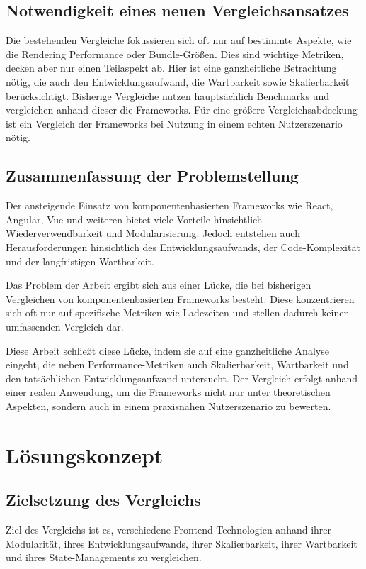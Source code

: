 \documentclass[oneside]{ausarbeitung}
\begin{document}
\section{Notwendigkeit eines neuen Vergleichsansatzes}

Die bestehenden Vergleiche fokussieren sich oft nur auf bestimmte Aspekte, wie die Rendering Performance oder Bundle-Größen. Dies sind wichtige Metriken, decken aber nur einen Teilaspekt ab. Hier ist eine ganzheitliche Betrachtung nötig, die auch den Entwicklungsaufwand, die Wartbarkeit sowie Skalierbarkeit berücksichtigt. Bisherige Vergleiche nutzen hauptsächlich Benchmarks und vergleichen anhand dieser die Frameworks. Für eine größere Vergleichsabdeckung ist ein Vergleich der Frameworks bei Nutzung in einem echten Nutzerszenario nötig. 

\section{Zusammenfassung der Problemstellung}
Der ansteigende Einsatz von komponentenbasierten Frameworks wie React, Angular, Vue und weiteren bietet viele Vorteile hinsichtlich Wiederverwendbarkeit und Modularisierung. Jedoch entstehen auch Herausforderungen hinsichtlich des Entwicklungsaufwands, der Code-Komplexität und der langfristigen Wartbarkeit.

Das Problem der Arbeit ergibt sich aus einer Lücke, die bei bisherigen Vergleichen von komponentenbasierten Frameworks besteht. Diese konzentrieren sich oft nur auf spezifische Metriken wie Ladezeiten und stellen dadurch keinen umfassenden Vergleich dar.

Diese Arbeit schließt diese Lücke, indem sie auf eine ganzheitliche Analyse eingeht, die neben Performance-Metriken auch Skalierbarkeit, Wartbarkeit und den tatsächlichen Entwicklungsaufwand untersucht. Der Vergleich erfolgt anhand einer realen Anwendung, um die Frameworks nicht nur unter theoretischen Aspekten, sondern auch in einem praxisnahen Nutzerszenario zu bewerten.

\chapter{Lösungskonzept}
\label{cha:loesungskonzept}

\section{Zielsetzung des Vergleichs}
Ziel des Vergleichs ist es, verschiedene Frontend-Technologien anhand ihrer Modularität, ihres Entwicklungsaufwands, ihrer Skalierbarkeit, ihrer Wartbarkeit und ihres State-Managements zu vergleichen.
\end{document}
